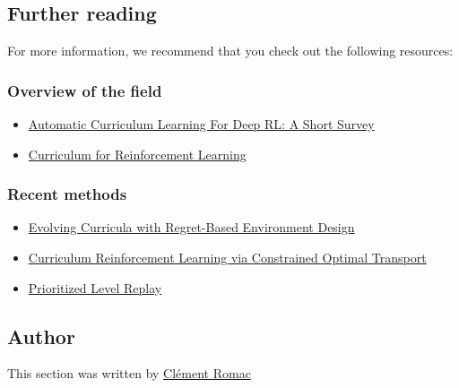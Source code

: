 \documentclass[11pt,a4paper]{article}
\begin{document}

\subsection{Further reading}\label{further-reading}

For more information, we recommend that you check out the following resources:

\subsubsection{Overview of the field}\label{overview-of-the-field}

\begin{itemize}
\item
  \href{https://arxiv.org/pdf/2003.04664.pdf}{Automatic Curriculum Learning For Deep RL: A Short Survey}
\item
  \href{https://lilianweng.github.io/posts/2020-01-29-curriculum-rl/}{Curriculum for Reinforcement Learning}
\end{itemize}

\subsubsection{Recent methods}\label{recent-methods}

\begin{itemize}
\item
  \href{https://arxiv.org/abs/2203.01302}{Evolving Curricula with Regret-Based Environment Design}
\item
  \href{https://proceedings.mlr.press/v162/klink22a.html}{Curriculum Reinforcement Learning via Constrained Optimal Transport}
\item
  \href{https://arxiv.org/abs/2010.03934}{Prioritized Level Replay}
\end{itemize}

\subsection{Author}\label{author}

This section was written by \href{https://twitter.com/ClementRomac}{Clément Romac}
\end{document}
